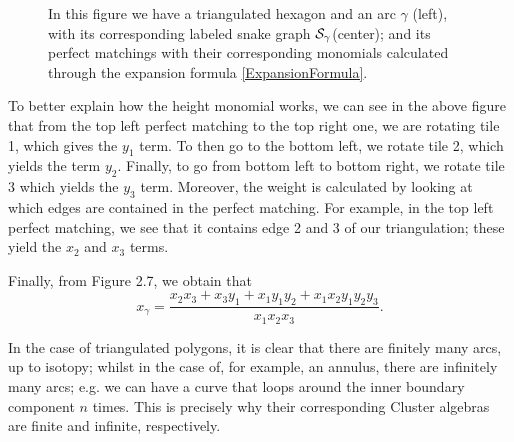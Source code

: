 \begin{figure}[H]
\begin{tikzpicture}[x=0.75pt,y=0.75pt,yscale=-1,xscale=1]
\end{tikzpicture}

\caption{In this figure we have a triangulated hexagon and an arc $\gamma$ (left), with its corresponding labeled snake graph $\s_{\gamma}$(center); and its perfect matchings with their corresponding monomials calculated through the expansion formula \ref{ExpansionFormula}.}
\end{figure}

To better explain how the height monomial works, we can see in the above figure that from the top left perfect matching to the top right one, we are rotating tile 1, which gives the $y_1$ term. To then go to the bottom left, we rotate tile 2, which yields the term $y_2$. Finally, to go from bottom left to bottom right, we rotate tile 3 which yields the $y_3$ term. Moreover, the weight is calculated by looking at which edges are contained in the perfect matching. For example, in the top left perfect matching, we see that it contains edge 2 and 3 of our triangulation; these yield the $x_2$ and $x_3$ terms.

Finally, from Figure 2.7, we obtain that
\begin{equation*}
    x_{\gamma} = \dfrac{x_2x_3 + x_3y_1 + x_1y_1y_2 + x_1x_2y_1y_2y_3}{x_1x_2x_3}.
\end{equation*}

In the case of triangulated polygons, it is clear that there are finitely many arcs, up to isotopy; whilst in the case of, for example, an annulus, there are infinitely many arcs; e.g. we can have a curve that loops around the inner boundary component $n$ times. This is precisely why their corresponding Cluster algebras are finite and infinite, respectively. 

